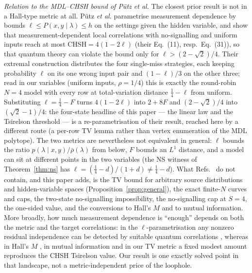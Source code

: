 \documentclass[aps,pra,reprint,superscriptaddress,floatfix]{revtex4-2}
\begin{document}
\emph{Relation to the MDL--CHSH bound of P\"utz \emph{et al.}} The
closest prior result is not in a Hall-type metric at all. P\"utz
\emph{et al.} \cite{putz2014,putzgisin2016} parametrise measurement
dependence by bounds $\ell\le P(x,y\mid\lambda)\le h$ on the settings given
the hidden variable, and show that measurement-dependent local
correlations with no-signalling and uniform inputs reach at most
$\mathrm{CHSH}=4(1-2\ell)$ (their Eq.~(11), resp.\ Eq.~(31)), so that
quantum theory can violate the bound only for $\ell>(2-\sqrt2)/4$. Their
extremal construction distributes the four single-miss strategies, each
keeping probability $\ell$ on its one wrong input pair and $(1-\ell)/3$ on
the other three; read in our variables (uniform inputs, $\rho=1/4$) this is
exactly the round-robin $N=4$ model with every row at total-variation
distance $\tfrac14-\ell$ from uniform. Substituting $\ell=\tfrac14-F$ turns
$4(1-2\ell)$ into $2+8F$ and $(2-\sqrt2)/4$ into $(\sqrt2-1)/4$: the
four-state headline of this paper --- the linear law and the Tsirelson
threshold --- is a re-parametrisation of their result, reached here by a
different route (a per-row TV lemma rather than vertex enumeration of the
MDL polytope). The two metrics are nevertheless not equivalent in general:
$\ell$ bounds the ratio $p(\lambda\mid x,y)/\bar\rho(\lambda)$ from below,
$F$ bounds an $L^1$ distance, and a model can sit at different points in
the two variables (the NS witness of Theorem~\ref{thm:ns} has
$\ell=(\tfrac14-d)/(1+d)\ne\tfrac14-d$). What Refs.~ do not contain, and this paper adds, is the TV bound for
arbitrary source distributions and hidden-variable spaces
(Proposition~\ref{prop:general}), the exact finite-$N$ curves and caps,
the two-state no-signalling impossibility, the no-signalling cap at $S=4$,
the one-sided value, and the conversions to Hall's $M$ and to mutual
information. More broadly, how much measurement dependence is ``enough''
depends on both the metric and the target correlations: in the
$\ell$-parametrisation any nonzero residual independence can be detected
by suitable quantum correlations \cite{putz2014}, whereas in Hall's $M$
\cite{hall2010}, in mutual information \cite{barrettgisin2011,
hallbranciard2020} and in our TV metric a fixed modest amount reproduces
the CHSH Tsirelson value. Our result is one exactly solved point in that
landscape, not a metric-independent price of the loophole.
\end{document}
